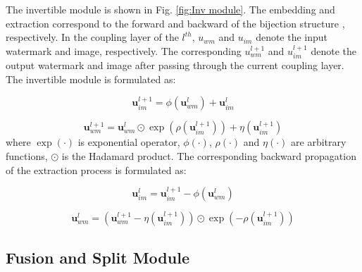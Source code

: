 \documentclass[sigconf]{acmart}
\begin{document}
The invertible module is shown in Fig. \ref{fig:Inv module}. The embedding and extraction correspond to the forward and backward of the bijection structure \cite{xiao2020invertible}, respectively. In the coupling layer of the $l^{th}$, $u_{wm}$ and $u_{im}$ denote the input watermark and image, respectively. The corresponding $u_{wm}^{l+1}$ and $u_{im}^{l+1}$ denote the output watermark and image after passing through the current coupling layer. 
The invertible module is formulated as:
 
\begin{equation}
    \mathbf{u}_{im}^{l+1}= \phi(\mathbf{u}_{wm}^{l})+\mathbf{u}_{im}^{l}
\end{equation}

\begin{equation}
    \mathbf{u}_{wm}^{l+1}=\mathbf{u}_{wm}^{l} \odot \exp \left(\rho\left(\mathbf{u}_{im}^{l+1}\right)\right)+\eta\left(\mathbf{u}_{im}^{l+1}\right)
\end{equation}
where $\exp(\cdot)$ is exponential operator, $\phi(\cdot)$, $\rho(\cdot)$ and $\eta(\cdot)$ are arbitrary functions, $\odot$ is the Hadamard product. The corresponding backward propagation of the  extraction process is formulated as:

\begin{equation}
   \mathbf{u}_{im}^{l}=\mathbf{u}_{im}^{l+1}-\phi\left(\mathbf{u}_{wm}^{l}\right)
\end{equation}

\begin{equation}
	\mathbf{u}_{wm}^{l}=\left(\mathbf{u}_{wm}^{l+1}-\eta\left(\mathbf{u}_{im}^{l+1}\right)\right) \odot \exp \left(-\rho\left(\mathbf{u}_{im}^{l+1}\right)\right)
\end{equation}



\subsection{Fusion and Split Module}
\end{document}
